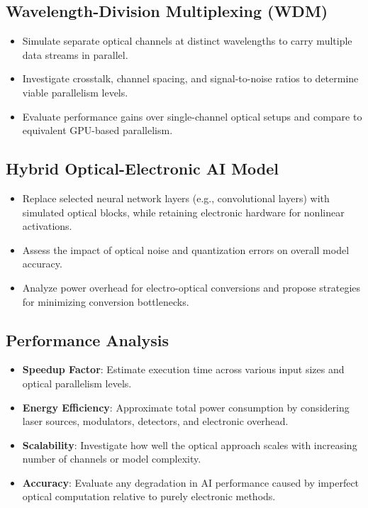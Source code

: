 \documentclass[conference]{IEEEtran}
\begin{document}
\subsection{Wavelength-Division Multiplexing (WDM)}
\begin{itemize}
    \item Simulate separate optical channels at distinct wavelengths to carry multiple data streams in parallel.
    \item Investigate crosstalk, channel spacing, and signal-to-noise ratios to determine viable parallelism levels.
    \item Evaluate performance gains over single-channel optical setups and compare to equivalent GPU-based parallelism.
\end{itemize}

\subsection{Hybrid Optical-Electronic AI Model}
\begin{itemize}
    \item Replace selected neural network layers (e.g., convolutional layers) with simulated optical blocks, while retaining electronic hardware for nonlinear activations.
    \item Assess the impact of optical noise and quantization errors on overall model accuracy.
    \item Analyze power overhead for electro-optical conversions and propose strategies for minimizing conversion bottlenecks.
\end{itemize}

\subsection{Performance Analysis}
\begin{itemize}
    \item \textbf{Speedup Factor}: Estimate execution time across various input sizes and optical parallelism levels.
    \item \textbf{Energy Efficiency}: Approximate total power consumption by considering laser sources, modulators, detectors, and electronic overhead.
    \item \textbf{Scalability}: Investigate how well the optical approach scales with increasing number of channels or model complexity.
    \item \textbf{Accuracy}: Evaluate any degradation in AI performance caused by imperfect optical computation relative to purely electronic methods.
\end{itemize}
\end{document}
